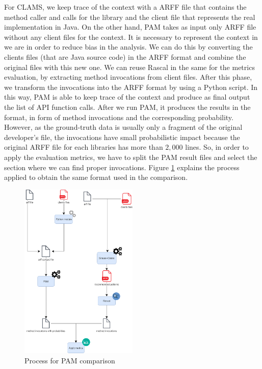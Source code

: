 



For CLAMS, we keep trace of the context with a ARFF file that contains the method caller and calls for the library and the client file that represents the real implementation in Java. On the other hand, PAM takes as input only ARFF file without any client files for the context. It is necessary to represent the context in we are in order to reduce bias in the analysis. We can do this by converting the clients files (that are Java source code) in the ARFF format and combine the original files with this new one. We can reuse Rascal in the same for the metrics evaluation, by extracting method invocations from client files. After this phase, we transform the invocations into the ARFF format by using a Python script. In this way, PAM is able to keep trace of the context and produce as final output the list of API function calls. After we run PAM, it produces the results in the format, in form of method invocations and the corresponding probability. However, as the ground-truth data is usually only a fragment of the original developer's file, the invocations have small probabilistic impact because the original ARFF file for each libraries has more than $2,000$ lines. So, in order to apply the evaluation metrics, we have to split the PAM result files and select the section where we can find proper invocations. Figure \ref{fig:Process} explains the process applied to obtain the same format used in the comparison.

 
\begin{figure}[!h]
\includegraphics[width=0.50\textwidth]{images/PAM.png}
\centering
  \caption{Process for PAM comparison}
  \label{fig:Process}
\end{figure}



